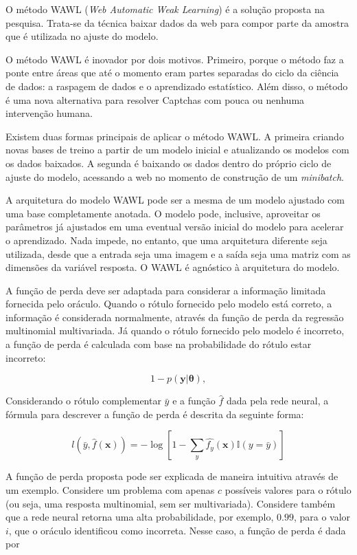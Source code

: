 \documentclass[12pt,twoside,brazilian]{book}
\begin{document}
O método WAWL (\emph{Web Automatic Weak Learning}) é a solução proposta
na pesquisa. Trata-se da técnica baixar dados da web para compor parte
da amostra que é utilizada no ajuste do modelo.

O método WAWL é inovador por dois motivos. Primeiro, porque o método faz
a ponte entre áreas que até o momento eram partes separadas do ciclo da
ciência de dados: a raspagem de dados e o aprendizado estatístico. Além
disso, o método é uma nova alternativa para resolver Captchas com pouca
ou nenhuma intervenção humana.

Existem duas formas principais de aplicar o método WAWL. A primeira
criando novas bases de treino a partir de um modelo inicial e
atualizando os modelos com os dados baixados. A segunda é baixando os
dados dentro do próprio ciclo de ajuste do modelo, acessando a web no
momento de construção de um \emph{minibatch}.

A arquitetura do modelo WAWL pode ser a mesma de um modelo ajustado com
uma base completamente anotada. O modelo pode, inclusive, aproveitar os
parâmetros já ajustados em uma eventual versão inicial do modelo para
acelerar o aprendizado. Nada impede, no entanto, que uma arquitetura
diferente seja utilizada, desde que a entrada seja uma imagem e a saída
seja uma matriz com as dimensões da variável resposta. O WAWL é
agnóstico à arquitetura do modelo.

A função de perda deve ser adaptada para considerar a informação
limitada fornecida pelo oráculo. Quando o rótulo fornecido pelo modelo
está correto, a informação é considerada normalmente, através da função
de perda da regressão multinomial multivariada. Já quando o rótulo
fornecido pelo modelo é incorreto, a função de perda é calculada com
base na probabilidade do rótulo estar incorreto:

\[
1 - p(\mathbf y|\boldsymbol \theta),
\]

Considerando o rótulo complementar \(\bar y\) e a função \(\hat f\) dada
pela rede neural, a fórmula para descrever a função de perda é descrita
da seguinte forma:

\[
l(\bar y, \hat f(\mathbf x)) = -\log\left[1 - \sum_{y}\hat {f_y}(\mathbf x) \mathbb I(y=\bar y)\right]
\]

A função de perda proposta pode ser explicada de maneira intuitiva
através de um exemplo. Considere um problema com apenas \(c\) possíveis
valores para o rótulo (ou seja, uma resposta multinomial, sem ser
multivariada). Considere também que a rede neural retorna uma alta
probabilidade, por exemplo, \(0.99\), para o valor \(i\), que o oráculo
identificou como incorreta. Nesse caso, a função de perda é dada por
\end{document}
